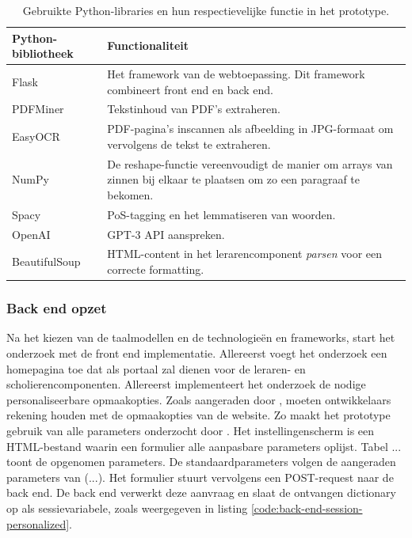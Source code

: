 \begin{center}
	\begin{table}[H]
	\begin{tabular}{ | m{4cm} | m{11cm} | } 
		\hline
		\textbf{Python-bibliotheek} & \textbf{Functionaliteit} \\
		\hline
		Flask					& Het framework van de webtoepassing. Dit framework combineert front end en back end. \\ 
		\hline
		PDFMiner 				& Tekstinhoud van PDF's extraheren. \\ 
		\hline
		EasyOCR					& PDF-pagina's inscannen als afbeelding in JPG-formaat om vervolgens de tekst te extraheren. \\
		\hline
		NumPy 					& De reshape-functie vereenvoudigt de manier om arrays van zinnen bij elkaar te plaatsen om zo een paragraaf te bekomen. \\
		\hline		
		Spacy 					& PoS-tagging en het lemmatiseren van woorden. \\
		\hline
		OpenAI					& GPT-3 API aanspreken. \\
		\hline
		BeautifulSoup			& HTML-content in het lerarencomponent \textit{parsen} voor een correcte formatting. \\
		\hline
	\end{tabular}
	\caption{Gebruikte Python-libraries en hun respectievelijke functie in het prototype.}
	\label{table:python-libraries}
	\end{table}
\end{center}

\subsubsection{Back end opzet}

Na het kiezen van de taalmodellen en de technologieën en frameworks, start het onderzoek met de front end implementatie. Allereerst voegt het onderzoek een homepagina toe dat als portaal zal dienen voor de leraren- en scholierencomponenten. Allereerst implementeert het onderzoek de nodige personaliseerbare opmaakopties. Zoals aangeraden door \textcite{Galliussi2020}, moeten ontwikkelaars rekening houden met de opmaakopties van de website. Zo maakt het prototype gebruik van alle parameters onderzocht door \textcite{Rello2013a, Rello2013b}. Het instellingenscherm is een HTML-bestand waarin een formulier alle aanpasbare parameters oplijst. Tabel ... toont de opgenomen parameters. De standaardparameters volgen de aangeraden parameters van (...). Het formulier stuurt vervolgens een POST-request naar de back end. De back end verwerkt deze aanvraag en slaat de ontvangen dictionary op als sessievariabele, zoals weergegeven in listing \ref{code:back-end-session-personalized}. 



